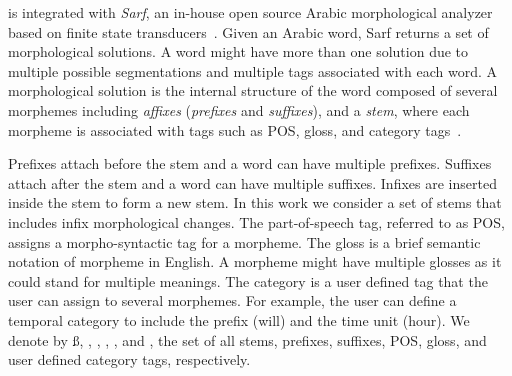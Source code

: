 \framework is integrated with {\em Sarf}, 
an in-house open source Arabic morphological analyzer based on 
finite state transducers~\cite{ZaMaColing2012DemosSarf}. 
Given an Arabic word, Sarf returns 
a set of morphological solutions. 
A word might have more than one solution 
due to multiple possible segmentations and multiple tags associated 
with each word. 
A morphological solution is the internal structure of the word 
composed of several morphemes including 
{\em affixes} ({\em prefixes} and {\em suffixes}), and a
{\em stem}, where each morpheme is associated with tags such as 
POS, gloss, and category tags~\cite{arabicmorph,habash2010introduction}. 

Prefixes attach before the stem and a word can have multiple prefixes. 
Suffixes attach after the stem and a word can have multiple suffixes. 
Infixes are inserted inside the stem to form a new stem. 
In this work we consider a set of stems that includes infix morphological changes. 
The part-of-speech tag, referred to as POS, 
assigns a morpho-syntactic tag for a morpheme. 
The gloss is a brief semantic notation of morpheme in English. 
A morpheme might have multiple glosses as it could stand for multiple meanings. 
The category is a user defined tag that the user can assign to several 
morphemes.
For example, the user can define a temporal category to include the 
prefix  (will) and the time unit  (hour). 
We denote by 
\ss,
\pp,
\xx,
\PP,
\GG, and 
\AC, the set of 
all stems,
prefixes,
suffixes,
POS,
gloss, 
and user defined category tags, respectively. 


\vocalize

\begin{table}[tb!]
  \centering
  \caption{Sample solution vector for .}
    \vspace{-3em}
  \label{tab:samplesolution}%
\end{table}%

